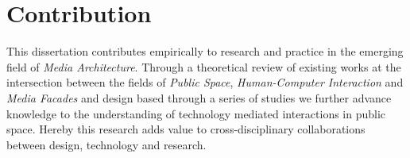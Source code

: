 




\section{Contribution}

This dissertation contributes empirically to research and practice in the emerging field of \textit{Media Architecture}. Through a theoretical review of existing works at the intersection between the fields of \textit{Public Space}, \textit{Human-Computer Interaction} and \textit{Media Facades} and design based through a series of studies we further advance knowledge to the understanding of technology mediated interactions in public space. Hereby this research adds value to cross-disciplinary collaborations  between design, technology and research.

